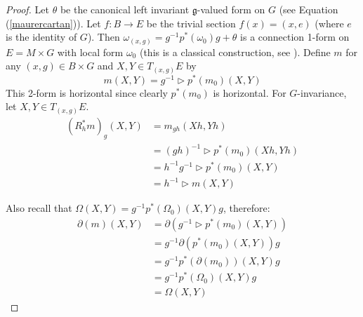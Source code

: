 \begin{proof}

Let $\theta$ be the canonical left invariant $\mathfrak{g}$-valued form on $G$ (see Equation (\ref{maurercartan})). Let $f:B\rightarrow E$ be the trivial section $f(x)=(x,e)$ (where $e$ is the identity of $G$). Then $\omega_{(x,g)}=g^{-1}p^*(\omega_0)g+\theta$ is a connection 1-form on $E=M\times G$ with local form $\omega_0$ (this is a classical construction, see \cite[p. 67]{kobayashi1}).
Define $m$ for any $(x,g)\in B\times G$ and $X,Y\in T_{(x,g)}E$ by \[
m(X,Y)=g^{-1}\vartriangleright p^*(m_0)(X,Y)
\]
This 2-form is horizontal since clearly $p^*(m_0)$ is horizontal. For $G$-invariance, let $X,Y\in T_{(x,g)}E$.
\begin{align*}
 (R_h^*m)_g(X,Y)&=m_{gh}(Xh,Yh)\\
&=(gh)^{-1}\vartriangleright p^*(m_0)(Xh,Yh)\\
&=h^{-1}g^{-1}\vartriangleright p^*(m_0)(X,Y)\\
&=h^{-1}\vartriangleright m(X,Y)
\end{align*}

Also recall that $\Omega(X,Y)=g^{-1}p^*(\Omega_0)(X,Y)g$, therefore:
\begin{align*}
\partial (m) (X,Y)&= \partial(g^{-1}\vartriangleright p^*(m_0)(X,Y))\\
& =g^{-1}\partial (p^*(m_0)(X,Y)) g\\
& =g^{-1}p^*(\partial(m_0))(X,Y) g\\
& =g^{-1}p^*(\Omega_0)(X,Y)g\\
& =\Omega(X,Y)
\end{align*}

\end{proof}

% 
% 	


